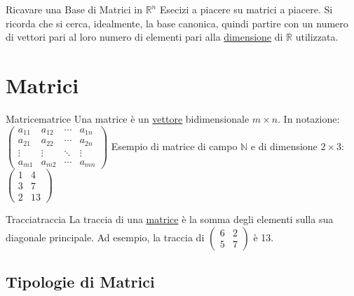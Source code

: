 \documentclass{article}
\begin{document}
\begin{exercise}{Ricavare una Base di Matrici in $\mathbb{R}^n$}{}
    Esecizi a piacere su matrici a piacere. Si ricorda che si cerca, idealmente, la base canonica, quindi partire con un numero di vettori pari al loro numero di elementi pari alla \hyperref[def:dimensione_spazio_vettoriale]{dimensione} di $\mathbb{R}$ utilizzata.
\end{exercise}

\section{Matrici}

\begin{definition}{Matrice}{matrice}
    Una matrice è un \hyperref[def:vettore]{vettore} bidimensionale $m \times n$. In notazione: $\begin{pmatrix}
    a_{11} & a_{12} & \cdots & a_{1n} \\
    a_{21} & a_{22} & \cdots & a_{2n} \\
    \vdots & \vdots & \ddots & \vdots \\
    a_{m1} & a_{m2} & \cdots & a_{mn}
    \end{pmatrix}$ Esempio di matrice di campo $\mathbb{N}$ e di dimensione $2 \times 3$: $\begin{pmatrix}
    1 & 4 \\
    3 & 7 \\
    2 & 13
    \end{pmatrix}$
\end{definition}

\begin{definition}{Traccia}{traccia}
    La traccia di una \hyperref[def:matrice]{matrice} è la somma degli elementi sulla sua diagonale principale. Ad esempio, la traccia di $\begin{pmatrix} 6 & 2 \\ 5 & 7 \end{pmatrix}$ è 13.
\end{definition}

\subsection{Tipologie di Matrici}
\end{document}
